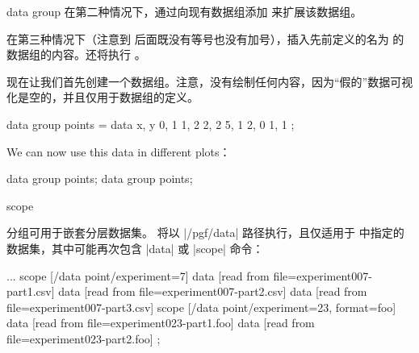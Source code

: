 \begin{datavisualizationoperation}{data group}{}
    在第二种情况下，通过向现有数据组添加  来扩展该数据组。


    在第三种情况下（注意到  后面既没有等号也没有加号），插入先前定义的名为  的数据组的内容。还将执行 。


    现在让我们首先创建一个数据组。注意，没有绘制任何内容，因为``假的''数据可视化是空的，并且仅用于数据组的定义。
\begin{codeexample}
\tikz \datavisualization data group {points} = {
  data {
    x, y
    0, 1
    1, 2
    2, 2
    5, 1
    2, 0
    1, 1
  }
};
\end{codeexample}


    We can now use this data in different plots：
\begin{codeexample}[preamble={\usetikzlibrary{datavisualization}}]
\tikz {} data group {points};
\qquad
\tikz \datavisualization [scientific axes=clean, visualize as line] data group {points};
\end{codeexample}
\end{datavisualizationoperation}

\begin{datavisualizationoperation}{scope}{} %

    分组可用于嵌套分层数据集。 将以 |/pgf/data| 路径执行，且仅适用于  中指定的数据集，其中可能再次包含 |data| 或 |scope| 命令：
\begin{codeexample}
\datavisualization...
  scope [/data point/experiment=7]
  {
    data [read from file=experiment007-part1.csv]
    data [read from file=experiment007-part2.csv]
    data [read from file=experiment007-part3.csv]
  }
  scope [/data point/experiment=23, format=foo]
  {
    data [read from file=experiment023-part1.foo]
    data [read from file=experiment023-part2.foo]
  };
\end{codeexample}
\end{datavisualizationoperation}

